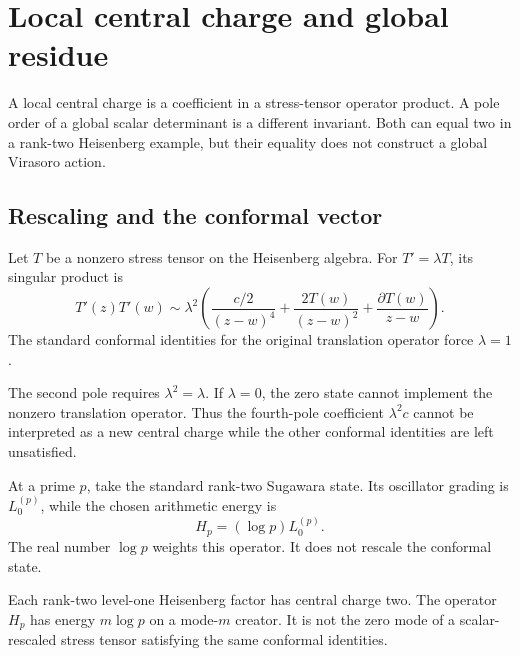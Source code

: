 \chapter{Local central charge and global residue}
\label{v4-arith:polyakov}

A local central charge is a coefficient in a stress-tensor
operator product. A pole order of a global scalar determinant
is a different invariant. Both can equal two in a rank-two
Heisenberg example, but their equality does not construct a
global Virasoro action.

\section{Rescaling and the conformal vector}
\label{v4-arith:pol:rescaling-not-conformal}

\begin{observation}
\label{v4-arith:obs:rescaling-breaks-virasoro}
Let \(T\) be a nonzero stress tensor on the Heisenberg algebra.
For \(T'=\lambda T\), its singular product is
\[
 T'(z)T'(w)\sim\lambda^2\left(
       \frac{c/2}{(z-w)^4}+\frac{2T(w)}{(z-w)^2}
                              +\frac{\partial T(w)}{z-w}\right).
\]
The standard conformal identities for the original translation
operator force \(\lambda=1\).
\end{observation}

The second pole requires \(\lambda^2=\lambda\).
If \(\lambda=0\), the zero state cannot implement the nonzero
translation operator. Thus the fourth-pole coefficient
\(\lambda^2c\) cannot be interpreted as a new central charge
while the other conformal identities are left unsatisfied.

\begin{remark}
At a prime \(p\), take the standard rank-two Sugawara state.
Its oscillator grading is \(L_0^{(p)}\), while the chosen
arithmetic energy is
\[
                         H_p=(\log p)L_0^{(p)}.
\]
The real number \(\log p\) weights this operator.
It does not rescale the conformal state.
\end{remark}

\begin{theorem}
\label{v4-arith:thm:per-prime-c}
Each rank-two level-one Heisenberg factor has central charge two.
The operator \(H_p\) has energy \(m\log p\) on a
mode-\(m\) creator. It is not the zero mode of a scalar-rescaled
stress tensor satisfying the same conformal identities.
\end{theorem}

